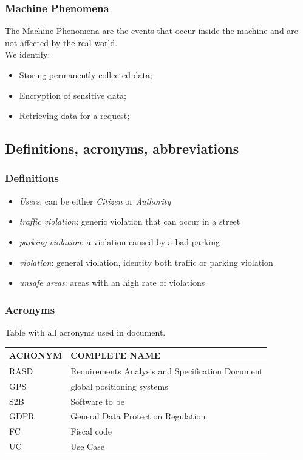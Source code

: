 \documentclass{article}
\begin{document}
\subsubsection{Machine Phenomena}
The Machine Phenomena are the events that occur inside the machine and are not affected by the real world.
\\We identify:
\begin{itemize}
    \item Storing permanently collected data;
    \item Encryption of sensitive data;
    \item Retrieving data for a request; 
\end{itemize} 

\subsection{Definitions, acronyms, abbreviations}

\subsubsection{Definitions}
\begin{itemize}
    \item \textit{Users}: can be either \textit{Citizen} or \textit{Authority}
    \item \textit{traffic violation}: generic violation that can occur in a street
    \item \textit{parking violation}: a violation caused by a bad parking
    \item \textit{violation}: general violation, identity both traffic or parking violation
    \item \textit{unsafe areas}: areas with an high rate of violations
\end{itemize}

\subsubsection{Acronyms}
Table with all acronyms used in document.
\begin{center}
\begin{tabular}{ | l | l |}
    \hline
    ACRONYM & COMPLETE NAME \\
    \hline
    RASD & Requirements Analysis and Specification Document \\
    \hline
    GPS & global positioning systems \\
    \hline
    S2B & Software to be \\
    \hline
    GDPR & General Data Protection Regulation \\
    \hline 
    FC & Fiscal code \\
    \hline
    UC & Use Case \\
    \hline
\end{tabular}
\end{center}
\end{document}
